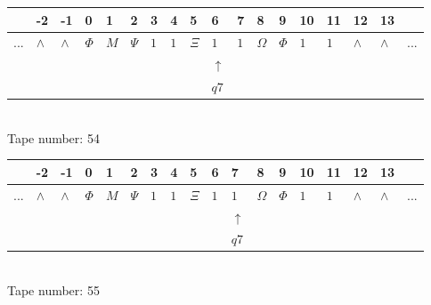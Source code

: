 \documentclass[11pt]{article}
\begin{document}
\begin{table}[H]
\centering
\begin{tabular}{llllllllllllllllll}
 & -2 & -1 & 0 & 1 & 2 & 3 & 4 & 5 & 6 & 7 & 8 & 9 & 10 & 11 & 12 & 13 & \\
\hline
$...$ & \multicolumn{1}{|l|}{$\wedge$} & \multicolumn{1}{|l|}{$\wedge$} & \multicolumn{1}{|l|}{$\Phi$} & \multicolumn{1}{|l|}{$M$} & \multicolumn{1}{|l|}{$\Psi$} & \multicolumn{1}{|l|}{$1$} & \multicolumn{1}{|l|}{$1$} & \multicolumn{1}{|l|}{$\Xi$} & \multicolumn{1}{|l|}{$1$} & \multicolumn{1}{|l|}{$1$} & \multicolumn{1}{|l|}{$\Omega$} & \multicolumn{1}{|l|}{$\Phi$} & \multicolumn{1}{|l|}{$1$} & \multicolumn{1}{|l|}{$1$} & \multicolumn{1}{|l|}{$\wedge$} & \multicolumn{1}{|l|}{$\wedge$} & $...$\\
\hline
&  &  &  &  &  &  &  &  & $\uparrow$ &  &  &  &  &  &  &  &  \\
&  &  &  &  &  &  &  &  & $ q7 $ &  &  &  &  &  &  &  &  \\
\end{tabular}
\\
Tape number: 54
\noindent\makebox[\linewidth]{\hdashrule{\textwidth}{1pt}{1pt}}\end{table}

\begin{table}[H]
\centering
\begin{tabular}{llllllllllllllllll}
 & -2 & -1 & 0 & 1 & 2 & 3 & 4 & 5 & 6 & 7 & 8 & 9 & 10 & 11 & 12 & 13 & \\
\hline
$...$ & \multicolumn{1}{|l|}{$\wedge$} & \multicolumn{1}{|l|}{$\wedge$} & \multicolumn{1}{|l|}{$\Phi$} & \multicolumn{1}{|l|}{$M$} & \multicolumn{1}{|l|}{$\Psi$} & \multicolumn{1}{|l|}{$1$} & \multicolumn{1}{|l|}{$1$} & \multicolumn{1}{|l|}{$\Xi$} & \multicolumn{1}{|l|}{$1$} & \multicolumn{1}{|l|}{$1$} & \multicolumn{1}{|l|}{$\Omega$} & \multicolumn{1}{|l|}{$\Phi$} & \multicolumn{1}{|l|}{$1$} & \multicolumn{1}{|l|}{$1$} & \multicolumn{1}{|l|}{$\wedge$} & \multicolumn{1}{|l|}{$\wedge$} & $...$\\
\hline
&  &  &  &  &  &  &  &  &  & $\uparrow$ &  &  &  &  &  &  &  \\
&  &  &  &  &  &  &  &  &  & $ q7 $ &  &  &  &  &  &  &  \\
\end{tabular}
\\
Tape number: 55
\noindent\makebox[\linewidth]{\hdashrule{\textwidth}{1pt}{1pt}}\end{table}
\end{document}
